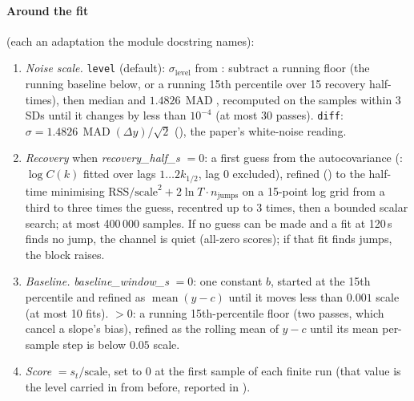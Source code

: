 \paragraph{Around the fit} (each an adaptation the module docstring names):
\begin{enumerate}
\item \emph{Noise scale.} \texttt{level} (default): $\sigma_\text{level}$ from :
  subtract a running floor (the running baseline below, or a running 15th percentile over
  15 recovery half-times), then median and $1.4826\,\operatorname{MAD}$, recomputed on the
  samples within 3 SDs until it changes by less than $10^{-4}$ (at most 30 passes).
  \texttt{diff}: $\sigma = 1.4826\,\operatorname{MAD}(\Delta y)/\sqrt2$ (), the
  paper's white-noise reading.
\item \emph{Recovery} when \emph{recovery\_half\_s} $= 0$: a first guess from the
  autocovariance (: $\log C(k)$ fitted over lags $1\ldots 2k_{1/2}$, lag 0
  excluded), refined () to the half-time minimising
  $\mathrm{RSS}/\text{scale}^2 + 2\ln T \cdot n_\text{jumps}$ on a 15-point log grid from a
  third to three times the guess, recentred up to 3 times, then a bounded scalar search; at
  most 400\,000 samples. If no guess can be made and a fit at 120\,s finds no jump, the
  channel is quiet (all-zero scores); if that fit finds jumps, the block raises.
\item \emph{Baseline.} \emph{baseline\_window\_s} $= 0$: one constant $b$, started at the 15th
  percentile and refined as $\operatorname{mean}(y - c)$ until it moves less than $0.001$ scale
  (at most 10 fits). $> 0$: a running 15th-percentile floor (two passes, which cancel a
  slope's bias), refined as the rolling mean of $y - c$ until its mean per-sample step is below
  $0.05$ scale.
\item \emph{Score} $= s_t/\text{scale}$, set to 0 at the first sample of each finite run (that
  value is the level carried in from before, reported in ).
\end{enumerate}

